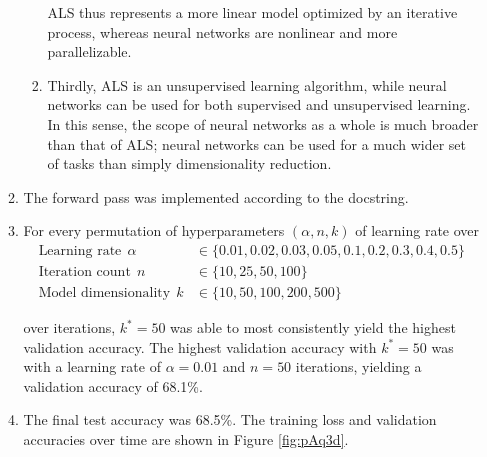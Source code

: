 \documentclass[10pt]{article}
\begin{document}
\begin{enumerate}
\begin{enumerate}[label = \textbf{\alph*}.]
\begin{enumerate}
        \spacer
        
        ALS thus represents a more linear model optimized by an iterative process, whereas neural networks are nonlinear and more parallelizable.
            \item Thirdly, ALS is an unsupervised learning algorithm, 
        while neural networks can be used for both supervised and unsupervised learning. In this sense, the scope of neural networks 
        as a whole is much broader than that of ALS; neural networks can be used for a much wider set of tasks than simply dimensionality reduction.
        \end{enumerate}
        \item The forward pass was implemented according to the docstring.
        \item For every permutation of hyperparameters $(\alpha, n, k)$ of learning rate over
        $$
            \begin{aligned}
                \text{Learning rate}~~\alpha &\in \{0.01, 0.02, 0.03, 0.05, 0.1, 0.2, 0.3, 0.4, 0.5\} \\
                \text{Iteration count}~~n &\in \{10, 25, 50, 100\} \\
                \text{Model dimensionality}~~k &\in \{10,50,100,200,500\}
            \end{aligned}
        $$
        
        over iterations, $k^* = 50$ 
        was able to most consistently yield the highest validation accuracy. The highest validation accuracy with $k^* = 50$ was with a learning rate of $\alpha=0.01$ and $n=50$ iterations, yielding a validation accuracy of 68.1\%.
        \item The final test accuracy was 68.5\%. The training loss and validation accuracies over time are shown in Figure \ref{fig:pAq3d}. 


\end{enumerate}
\end{enumerate}
\end{document}

